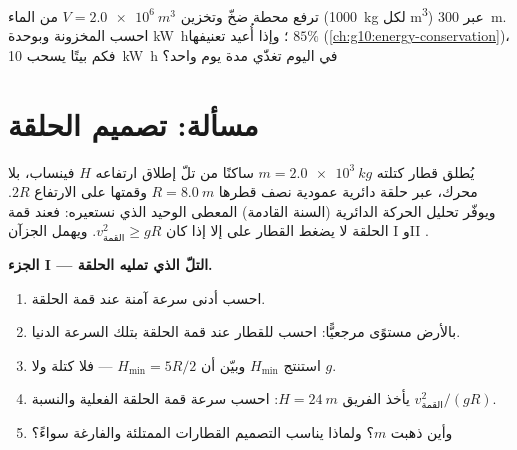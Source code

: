 \begin{exercise}[$\star\star\star$]\label{exo:g11:mechanical-energy:15}
ترفع محطة ضخّ وتخزين $V = \qty{2.0e6}{m^3}$ من الماء
(\qty{1000}{kg} لكل \unit{m^3}) عبر \qty{300}{m}. احسب
 المخزونة  وبوحدة \unit{kW.h}؛ وإذا أُعيد تعنيفها 
$85\%$ (\cref{ch:g10:energy-conservation})، فكم بيتًا يسحب
\qty{10}{kW.h} في اليوم تغذّي مدة يوم واحد؟
\end{exercise}

\section{مسألة: تصميم الحلقة}

\begin{problem}
\label{pb:g11:mechanical-energy:1}
يُطلق قطار كتلته $m = \qty{2.0e3}{kg}$ ساكنًا من تلّ إطلاق
ارتفاعه $H$ فينساب، بلا محرك، عبر حلقة دائرية عمودية
نصف قطرها $R = \qty{8.0}{m}$ وقمتها على الارتفاع $2R$.
ويوفّر تحليل الحركة الدائرية (السنة القادمة) المعطى الوحيد الذي نستعيره: فعند
قمة الحلقة لا يضغط القطار على  إلا إذا كان
$v_{\text{القمة}}^2 \geq gR$. ويهمل الجزآن I وII .

\medskip
\noindent\textbf{الجزء I --- التلّ الذي تمليه الحلقة.}
\begin{enumerate}
  \item احسب أدنى سرعة آمنة عند قمة الحلقة.
  \item بالأرض مستوًى مرجعيًّا: احسب  للقطار
        عند قمة الحلقة بتلك السرعة الدنيا.
  \item استنتج $H_{\min}$ وبيّن أن $H_{\min} = 5R/2$ --- فلا كتلة ولا $g$.
  \item يأخذ الفريق $H = \qty{24}{m}$: احسب سرعة قمة الحلقة الفعلية
        والنسبة $v_{\text{القمة}}^2/(gR)$.
  \item وأين ذهبت $m$؟ ولماذا يناسب التصميم القطارات الممتلئة
        والفارغة سواءً؟
\end{enumerate}


\end{problem}
